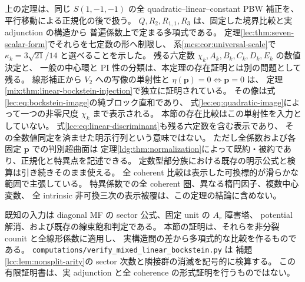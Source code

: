 \begin{remark}[係数の存在と明示化の区別]
\label{lcc:rem:scope}
上の定理は、同じ $S(1,-1,-1)$ の全 quadratic--linear--constant PBW 補正を、
平行移動による正規化の後で扱う。
$Q,R_2,R_{1,1},R_3$ は、固定した境界比較と実 adjunction の構造から
普遍係数上で定まる多項式である。
定理\ref{lec:thm:seven-scalar-form}でそれらを七定数の形へ制限し、
系\ref{mcs:cor:universal-scale}で $\kappa_k=3\sqrt{21}/14$ と選べることを示した。
残る六定数 $\chi_k,A_k,B_k,C_k,D_k,E_k$ の数値決定と、
一般の中心環と PI 性の分類は、本定理の存在証明とは別の問題として残る。
線形補正から $V_2$ への写像の単射性と
$\eta(\mathbf p)=0\Longleftrightarrow\mathbf p=0$ は、
定理\ref{mix:thm:linear-bockstein-injection}で独立に証明されている。
その像は式\eqref{lec:eq:bockstein-image}の純ブロック直和であり、
式\eqref{lec:eq:quadratic-image}によって一つの非零尺度 $\chi_k$ まで表示される。
本節の存在比較はこの単射性を入力としていない。
式\eqref{lcc:eq:linear-discriminant}も残る六定数を含む表示であり、
その全数値同定を済ませた明示行列という意味ではない。
ただし全係数および各固定 $\mathbf p$ での判別超曲面は
定理\ref{ldg:thm:normalization}によって既約・被約であり、正規化と特異点を記述できる。
定数型部分族における既存の明示公式と検算は引き続きそのまま使える。
全 coherent 比較は表示した可換標的が滑らかな範囲で主張している。
特異係数での全 coherent 圏、異なる楕円因子、複数中心変数、
全 intrinsic 非可換三次の表示被覆は、この定理の結論に含めない。

既知の入力は diagonal MF の sector 公式、固定 unit の $A_r$ 障害塔、
potential 解消、および既存の線束飽和判定である。
本節の証明は、それらを非分裂 counit と全線形係数に適用し、
実構造間の差から多項式的な比較を作るものである。
\texttt{computations/verify\_mixed\_linear\_bockstein.py} は
補題\ref{lcc:lem:nonsplit-arity}の sector 次数と隣接群の消滅を記号的に検算する。
この有限証明書は、実 adjunction と全 coherence の形式証明を行うものではない。
\end{remark}
